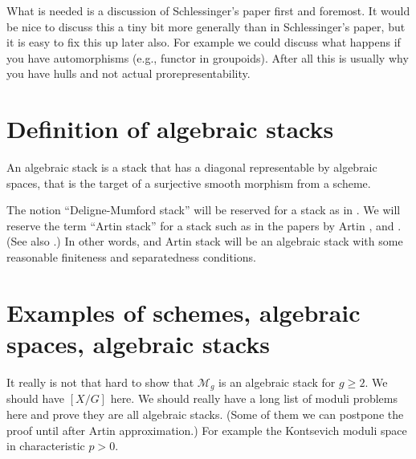 \noindent
What is needed is a discussion of Schlessinger's paper first and foremost.
It would be nice to discuss this a tiny bit more generally than in
Schlessinger's paper, but it is easy to fix this up later also.
For example we could discuss what happens if you have automorphisms
(e.g., functor in groupoids). After all this is usually why you have
hulls and not actual prorepresentability.


\section{Definition of algebraic stacks}
\label{section-definition-algebraic-stacks}

\noindent
An algebraic stack is a stack that has a diagonal representable by algebraic
spaces, that is the target of a surjective smooth morphism from a scheme.

\medskip\noindent
The notion ``Deligne-Mumford stack'' will be reserved for a stack as in
\cite{DM}. We will reserve the term ``Artin stack'' for
a stack such as in the papers by Artin \cite{ArtinI}, and \cite{ArtinVersal}.
(See also \cite{ConradeJong}.) In other words, and Artin stack will be an
algebraic stack with some reasonable finiteness and separatedness conditions.


\section{Examples of schemes, algebraic spaces, algebraic stacks}
\label{section-examples-stacks}

\noindent
It really is not that hard to show that $\mathcal{M}_g$ is an algebraic
stack for $g\geq 2$. We should have $[X/G]$ here. We should really
have a long list of moduli problems here and prove they are all algebraic
stacks. (Some of them we can postpone the proof until after Artin
approximation.) For example the Kontsevich moduli space in characteristic
$p > 0$.

